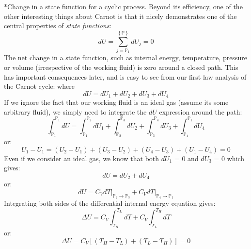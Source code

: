 \documentclass[11pt]{article}
\makeatletter
\theoremstyle{definition}
\renewcommand\subsubsection{\@startsection
	{subsubsection}{2}{0mm}
	{-0.05in}
	{-0.5\baselineskip}
	{\normalfont\normalsize\bfseries}}
\makeatother
\begin{document}
\subsubsection*{Change in a state function for a cyclic process.}
Beyond its efficiency, one of the other interesting things about Carnot is that it nicely demonstrates one of the central properties of \textit{state functions}:
\begin{equation}
dU = \sum_{j=\mathbb{P}_{1}}^{\left\{\mathbb{P}\right\}}dU_j = 0
\end{equation}The net change in a state function, such as internal energy, temperature, pressure or volume (irrespective of the working fluid) is zero around a closed path.
This has important consequences later, and is easy to see from our first law analysis of the Carnot cycle: where
\begin{equation}
dU = dU_{1}+dU_{2}+dU_{3}+dU_{4}
\end{equation}If we ignore the fact that our working fluid is an ideal gas (assume its some arbitrary fluid), we simply need to integrate the $dU$ expression around the
path:
\begin{equation}
\int_{\mathbb{P}_{1}}^{\mathbb{P}_{1}}dU = \int_{\mathbb{P}_{1}}^{\mathbb{P}_{2}}dU_{1}+\int_{\mathbb{P}_{2}}^{\mathbb{P}_{3}}dU_{2}+\int_{\mathbb{P}_{3}}^{\mathbb{P}_{4}}dU_{3}+\int_{\mathbb{P}_{4}}^{\mathbb{P}_{1}}dU_{4}
\end{equation}or:
\begin{equation}
U_{1} - U_{1} = \left(U_{2} - U_{1}\right) + \left(U_{3} - U_{2}\right) + \left(U_{4} - U_{3}\right) + \left(U_{1} - U_{4}\right) = 0
\end{equation}Even if we consider an ideal gas, we know that both $dU_{1}$ = 0 and $dU_{3}$ = 0 which gives:
\begin{equation}
dU  = dU_{2} + dU_{4}
\end{equation}or:
\begin{equation}
dU = C_{V}dT\Bigr|_{\mathbb{P}_{2}\rightarrow\mathbb{P}_{3}}+C_{V}dT\Bigr|_{\mathbb{P}_{4}\rightarrow\mathbb{P}_{1}}
\end{equation}Integrating both sides of the differential internal energy equation gives:
\begin{equation}
\Delta{U} = C_{V}\int_{T_{H}}^{T_{L}}dT+C_{V}\int_{T_{L}}^{T_{H}}dT
\end{equation}or:
\begin{equation}
\Delta{U} = C_{V}\left[\left(T_{H} - T_{L}\right)+\left(T_{L} - T_{H}\right)\right] = 0
\end{equation}
\end{document}
